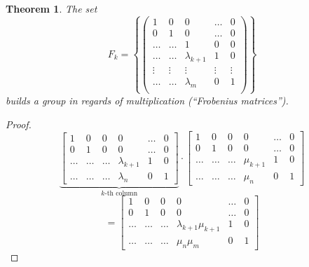 \documentclass[a4paper,landscape,twocolumn]{article}
\newcommand\set[1]{\left\{#1\right\}}
\newtheorem{theorem}{Theorem}[section]
\begin{document}
\begin{theorem}
  \label{satz-6.48}
  The set
  \[
    F_k = \set{\begin{pmatrix}
      1 & 0 & 0 & \ldots & 0 \\
      0 & 1 & 0 & \ldots & 0 \\
      \ldots & \ldots & 1 & 0 & 0 \\
      \ldots & \ldots & \lambda_{k+1} & 1 & 0 \\
      \vdots & \vdots & \vdots & \vdots & \vdots \\
      \ldots & \ldots & \lambda_{m} & 0 & 1 \\
    \end{pmatrix}}
  \]
  builds a group in regards of multiplication (\enquote{Frobenius matrices}).
\end{theorem}
\begin{proof}
  \[
    \underbrace{
    \begin{bmatrix}
      1 & 0 & 0 & 0 & \ldots & 0 \\
      0 & 1 & 0 & 0 & \ldots & 0 \\
      \ldots & \ldots & \ldots & \lambda_{k+1} & 1 & 0 \\
      \ldots & \ldots & \ldots & \lambda_{n} & 0 & 1
    \end{bmatrix}
    }_{\text{$k$-th column}}
    \cdot
    \begin{bmatrix}
      1 & 0 & 0 & 0 & \ldots & 0 \\
      0 & 1 & 0 & 0 & \ldots & 0 \\
      \ldots & \ldots & \ldots & \mu_{k+1} & 1 & 0 \\
      \ldots & \ldots & \ldots & \mu_{n} & 0 & 1
    \end{bmatrix}
  \] \[
    =
    \begin{bmatrix}
      1 & 0 & 0 & 0 & \ldots & 0 \\
      0 & 1 & 0 & 0 & \ldots & 0 \\
      \ldots & \ldots & \ldots & \lambda_{k+1} \mu_{k+1} & 1 & 0 \\
      \ldots & \ldots & \ldots & \mu_{n} \mu_{m} & 0 & 1
    \end{bmatrix}
  \]
\end{proof}
\end{document}
